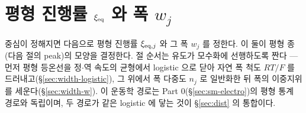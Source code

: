 \section{평형 진행률 $\xi_{\mathrm{eq}}$ 와 폭 $w_j$}\label{sec:width}
중심이 정해지면 다음으로 평형 진행률 $\xi_{\mathrm{eq},j}$ 와 그 폭 $w_j$ 를 정한다. 이 둘이 평형 종(다음 절의 peak)의
모양을 결정한다. 절 순서는 유도가 모수화에 선행하도록 짠다 --- 먼저 평형 등온선을 정$\cdot$역 속도의 균형에서
logistic 으로 닫아 자연 폭 척도 $RT/F$ 를 드러내고(\S\ref{sec:width-logistic}), 그 위에서 폭 다중도 $n_j$ 로
일반화한 뒤 폭의 이중지위를 세운다(\S\ref{sec:width-w}). 이 운동학 경로는 Part 0(\S\ref{sec:sm-electro})의 평형
통계 경로와 독립이며, 두 경로가 같은 logistic 에 닿는 것이 \S\ref{sec:dist} 의 통합이다.

